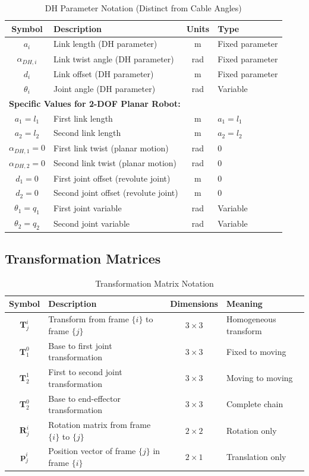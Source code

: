 \begin{table}[h!]
\centering
\caption{DH Parameter Notation (Distinct from Cable Angles)}
\begin{tabular}{|c|l|c|l|}
\hline
\textbf{Symbol} & \textbf{Description} & \textbf{Units} & \textbf{Type} \\
\hline
$a_i$ & Link length (DH parameter) & m & Fixed parameter \\
$\alpha_{DH,i}$ & Link twist angle (DH parameter) & rad & Fixed parameter \\
$d_i$ & Link offset (DH parameter) & m & Fixed parameter \\
$\theta_i$ & Joint angle (DH parameter) & rad & Variable \\
\hline
\multicolumn{4}{|l|}{\textbf{Specific Values for 2-DOF Planar Robot:}} \\
\hline
$a_1 = l_1$ & First link length & m & $a_1 = l_1$ \\
$a_2 = l_2$ & Second link length & m & $a_2 = l_2$ \\
$\alpha_{DH,1} = 0$ & First link twist (planar motion) & rad & 0 \\
$\alpha_{DH,2} = 0$ & Second link twist (planar motion) & rad & 0 \\
$d_1 = 0$ & First joint offset (revolute joint) & m & 0 \\
$d_2 = 0$ & Second joint offset (revolute joint) & m & 0 \\
$\theta_1 = q_1$ & First joint variable & rad & Variable \\
$\theta_2 = q_2$ & Second joint variable & rad & Variable \\
\hline
\end{tabular}
\end{table}

\subsection{Transformation Matrices}

\begin{table}[h!]
\centering
\caption{Transformation Matrix Notation}
\begin{tabular}{|c|l|c|l|}
\hline
\textbf{Symbol} & \textbf{Description} & \textbf{Dimensions} & \textbf{Meaning} \\
\hline
$\bm{T}_j^i$ & Transform from frame $\{i\}$ to frame $\{j\}$ & $3 \times 3$ & Homogeneous transform \\
$\bm{T}_1^0$ & Base to first joint transformation & $3 \times 3$ & Fixed to moving \\
$\bm{T}_2^1$ & First to second joint transformation & $3 \times 3$ & Moving to moving \\
$\bm{T}_2^0$ & Base to end-effector transformation & $3 \times 3$ & Complete chain \\
$\bm{R}_j^i$ & Rotation matrix from frame $\{i\}$ to $\{j\}$ & $2 \times 2$ & Rotation only \\
$\bm{p}_j^i$ & Position vector of frame $\{j\}$ in frame $\{i\}$ & $2 \times 1$ & Translation only \\
\hline
\end{tabular}
\end{table}

